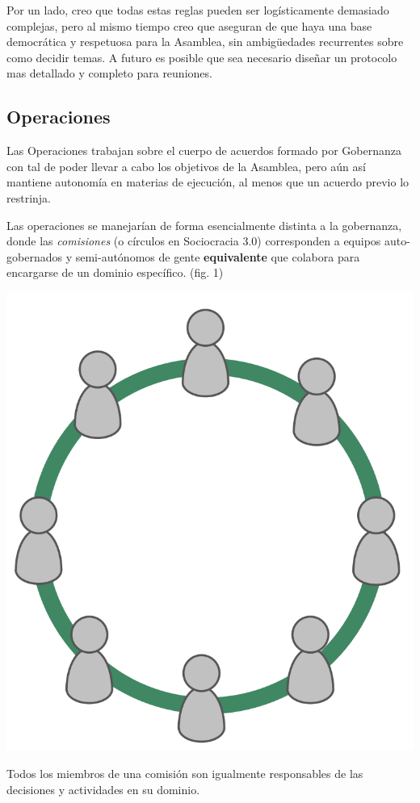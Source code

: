 \documentclass[justified]{tufte-handout} %
\begin{document}
Por un lado, creo que todas estas reglas pueden ser logísticamente demasiado complejas, pero al mismo tiempo creo que aseguran de que haya una base democrática y respetuosa para la Asamblea, sin ambigüedades recurrentes sobre como decidir temas. A futuro es posible que sea necesario diseñar un protocolo mas detallado y completo para reuniones.

\subsection{Operaciones}
Las Operaciones trabajan sobre el cuerpo de acuerdos formado por Gobernanza con tal de poder llevar a cabo los objetivos de la Asamblea, pero aún así mantiene autonomía en materias de ejecución, al menos que un acuerdo previo lo restrinja.

Las operaciones se manejarían de forma esencialmente distinta a la gobernanza, donde las \textit{comisiones} (o círculos en Sociocracia 3.0) corresponden a equipos auto-gobernados y semi-autónomos de gente \textbf{equivalente} que colabora para encargarse de un dominio específico. (fig. 1)
\begin{marginfigure}[-45px]
	\includegraphics[width=\linewidth]{circulo.png}
	\caption{Todos los miembros de una comisión son igualmente responsables de las decisiones y actividades en su dominio.}
	\label{fig:circulo}
\end{marginfigure}
\end{document}
